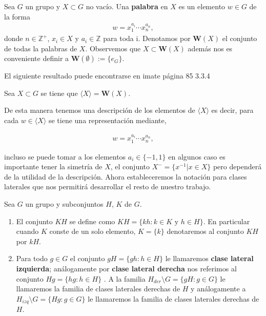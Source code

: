 \begin{df}
Sea $G$ un  grupo y $X \subset G$ no vacío. Una \textbf{palabra} en $X$ es un elemento $w \in G$ de la forma
\begin{align*}
w=x_1^{a_i} \cdots x_n^{a_n},
\end{align*}
donde $n \in \mathbb{Z}^+$, $x_i \in X$ y $a_i \in \mathbb{Z}$ para toda i. Denotamos por $\mathbf{W}(X)$ el conjunto de todas la palabras de  $X$. Observemos que $X \subset \mathbf{W}(X)$ además nos es conveniente definir a $\mathbf{W}(\emptyset) :=\{e_G\}$.
\end{df}

El siguiente resultado puede encontrarse en imate página 85 3.3.4

\begin{te}
Sea $X \subset G$ se tiene que $\langle X \rangle= \mathbf{W}(X)$.
\end{te}

De esta manera tenemos una descripción de los elementos de $\langle X \rangle$ es decir, para cada $w \in \langle X \rangle$ se tiene una representación mediante, 

\begin{align*}
w=x_1^{a_i} \cdots x_n^{a_n},
\end{align*}

incluso se puede tomar a los elementos $a_i \in \{-1,1\}$ en algunos caso es importante tener la simetría de $X$, el conjunto $X^-=\{x^{-1}| x \in X \}$ pero dependerá de la utilidad de la descripción. Ahora estableceremos la notación para clases laterales que nos permitirá desarrollar el resto de nuestro trabajo. 	
	
\begin{df}
Sea $G$ un grupo y subconjuntos $H$, $K$ de $G$.

\begin{enumerate}
		
	\item El conjunto $KH$ se define como  $KH=\{kh: k \in K \text{ y } h \in H \}$. En particular cuando $K$ conste de un solo elemento, $K=\{k\}$ denotaremos al conjunto $KH$ por $kH$.	

	\item Para todo $g \in G$ el conjunto $gH=\{gh:h \in H \}$ le llamaremos \textbf{clase lateral izquierda}; análogamente por \textbf{clase lateral derecha} nos referimos al conjunto $Hg=\{hg:h \in H\}$ . A la familia  $H_{der} \setminus G=\{gH:g \in G\}$
le llamaremos la familia de clases laterales derechas de $H$ y análogamente a $H_{izq}\setminus G=\{Hg:g \in G\}$
le llamaremos la familia de clases laterales derechas de $H$. 
\end{enumerate} 
\end{df}	

